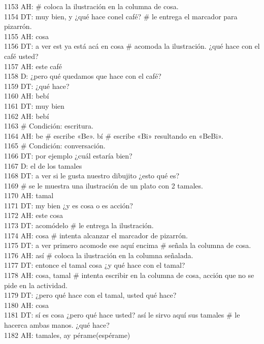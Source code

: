 1153 AH: # coloca la ilustración en la columna de cosa.\\
1154 DT: muy bien, y ¿qué hace conel café? # le entrega el marcador para pizarrón.\\
1155 AH: cosa\\
1156 DT: a ver est ya está acá en cosa # acomoda la ilustración. ¿qué hace con el café usted?\\
1157 AH: este café\\
1158 D: ¿pero qué quedamos que hace con el café?\\
1159 DT: ¿qué hace?\\
1160 AH: bebí\\
1161 DT: muy bien\\
1162 AH: bebí\\
1163 # Condición: escritura.\\
1164 AH: be # escribe «Be». bí # escribe «Bi» resultando en «BeBi».\\
1165 # Condición: conversación.\\
1166 DT: por ejemplo ¿cuál estaría bien?\\
1167 D: el de los tamales\\
1168 DT: a ver si le gusta nuestro dibujito ¿esto qué es?\\
1169 # se le muestra una ilustración de un plato con 2 tamales.\\
1170 AH: tamal\\
1171 DT: my bien ¿y es cosa o es acción?\\
1172 AH: este cosa\\
1173 DT: acomódelo # le entrega la ilustración.\\
1174 AH: cosa # intenta alcanzar el marcador de pizarrón.\\
1175 DT: a ver primero acomode ese aquí encima # señala la columna de cosa.\\
1176 AH: así # coloca la ilustración en la columna señalada.\\
1177 DT: entonce el tamal cosa ¿y qué hace con el tamal?\\
1178 AH: cosa, tamal # intenta escribir en la columna de cosa, acción que no se pide en la actividad.\\
1179 DT: ¿pero qué hace con el tamal, usted qué hace?\\
1180 AH: cosa\\
1181 DT: sí es cosa ¿pero qué hace usted? así le sirvo aquí sus tamales # le hacerca ambas manos. ¿qué hace?\\
1182 AH: tamales, ay pérame(espérame)\\
